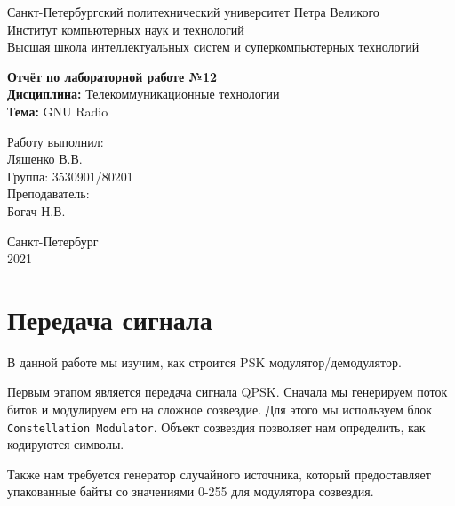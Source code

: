 \documentclass[a4paper,12pt]{report}
\begin{document}
 

\begin{titlepage}
\newpage
	\begin{center}
		\large Санкт-Петербургский политехнический университет Петра Великого\\
		Институт компьютерных наук и технологий\\
		Высшая школа интеллектуальных систем и суперкомпьютерных технологий\\
	\end{center}
\vspace{7cm}

\begin{center}
		\large \textbf{Отчёт по лабораторной работе №12} \\
		\textbf{Дисциплина:} Телекоммуникационные технологии\\
		\textbf{Тема:} GNU Radio
\end{center}
\vspace{4cm}
	
\begin{flushright}
		\large Работу выполнил:\\ Ляшенко В.В.\\
		Группа: 3530901/80201\\
		Преподаватель:\\ Богач Н.В.
\end{flushright}

\vspace{\fill}
\begin{center}
	\large Санкт-Петербург\\ 2021
	\end{center}
\end{titlepage}

\tableofcontents
\listoffigures

\chapter{Передача сигнала}
    В данной работе мы изучим, как строится PSK модулятор/демодулятор. 
    
    Первым этапом является передача сигнала QPSK. Сначала мы генерируем поток битов и модулируем его на сложное созвездие. Для этого мы используем блок \texttt{Constellation Modulator}. Объект созвездия позволяет нам определить, как кодируются символы. 
    
    Также нам требуется генератор случайного источника, который предоставляет упакованные байты со значениями 0-255 для модулятора созвездия.
    
\end{document}
